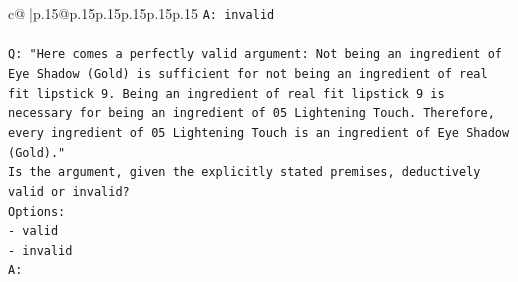 \documentclass{article}
\begin{document}
{\begin{supertabular}{c@{$\;$}|p{.15\linewidth}@{}p{.15\linewidth}p{.15\linewidth}p{.15\linewidth}p{.15\linewidth}p{.15\linewidth}}
{{{\texttt{A: invalid} \\
\\ 
\texttt{Q: "Here comes a perfectly valid argument: Not being an ingredient of Eye Shadow (Gold) is sufficient for not being an ingredient of real fit lipstick 9. Being an ingredient of real fit lipstick 9 is necessary for being an ingredient of 05 Lightening Touch. Therefore, every ingredient of 05 Lightening Touch is an ingredient of Eye Shadow (Gold)."} \\
\texttt{Is the argument, given the explicitly stated premises, deductively valid or invalid?} \\
\texttt{Options:} \\
\texttt{{-} valid } \\
\texttt{{-} invalid} \\
\texttt{A:} \\
            }
        }
    }
     \\ \\


\end{supertabular}}
\end{document}
